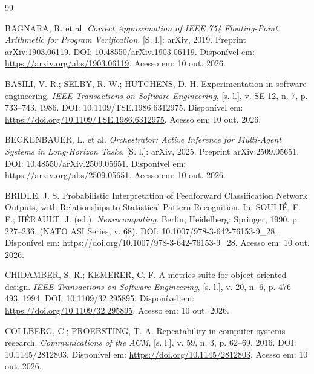 \documentclass[12pt,openany,oneside,a4paper,brazil,chapter=TITLE]{abntex2}
\begin{document}

\postextual
\begin{SingleSpacing}
\raggedright

\begin{thebibliography}{99}

 BAGNARA, R. et al. \textit{Correct Approximation of IEEE 754 Floating-Point Arithmetic for Program Verification}. [S. l.]: arXiv, 2019. Preprint arXiv:1903.06119. DOI: 10.48550/arXiv.1903.06119. Disponível em: \url{https://arxiv.org/abs/1903.06119}. Acesso em: 10 out. 2026.

 BASILI, V. R.; SELBY, R. W.; HUTCHENS, D. H. Experimentation in software engineering. \textit{IEEE Transactions on Software Engineering}, [s. l.], v. SE-12, n. 7, p. 733--743, 1986. DOI: 10.1109/TSE.1986.6312975. Disponível em: \url{https://doi.org/10.1109/TSE.1986.6312975}. Acesso em: 10 out. 2026.

 BECKENBAUER, L. et al. \textit{Orchestrator: Active Inference for Multi-Agent Systems in Long-Horizon Tasks}. [S. l.]: arXiv, 2025. Preprint arXiv:2509.05651. DOI: 10.48550/arXiv.2509.05651. Disponível em: \url{https://arxiv.org/abs/2509.05651}. Acesso em: 10 out. 2026.

 BRIDLE, J. S. Probabilistic Interpretation of Feedforward Classification Network Outputs, with Relationships to Statistical Pattern Recognition. In: SOULIÉ, F. F.; HÉRAULT, J. (ed.). \textit{Neurocomputing}. Berlin; Heidelberg: Springer, 1990. p. 227--236. (NATO ASI Series, v. 68). DOI: 10.1007/978-3-642-76153-9\_28. Disponível em: \url{https://doi.org/10.1007/978-3-642-76153-9_28}. Acesso em: 10 out. 2026.

 CHIDAMBER, S. R.; KEMERER, C. F. A metrics suite for object oriented design. \textit{IEEE Transactions on Software Engineering}, [s. l.], v. 20, n. 6, p. 476--493, 1994. DOI: 10.1109/32.295895. Disponível em: \url{https://doi.org/10.1109/32.295895}. Acesso em: 10 out. 2026.

 COLLBERG, C.; PROEBSTING, T. A. Repeatability in computer systems research. \textit{Communications of the ACM}, [s. l.], v. 59, n. 3, p. 62--69, 2016. DOI: 10.1145/2812803. Disponível em: \url{https://doi.org/10.1145/2812803}. Acesso em: 10 out. 2026.


\end{thebibliography}
\end{SingleSpacing}
\end{document}
